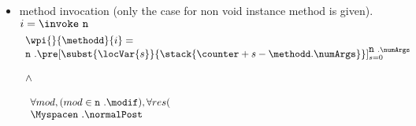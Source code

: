 \begin{itemize}
\begin{enumerate}
	\end{enumerate}
	 		\item method invocation  (only the case for non void instance method is given).
			$i =\invoke  \   \mbox{\rm\texttt{n} } $ 
	 				 			$$\begin{array}{l}
								 \wpi{ } {\methodd}{i}  =   \\
	 				 	 \mbox{\rm\texttt{n} } .\pre[ \subst{\locVar{s}}{ \stack{\counter + s -\methodd.\numArgs}}]_{s = 0}^{ \mbox{\rm\texttt{n} }  .\numArgs }  \\ \\
	 				 			\wedge \\\\
								\begin{array}{l}
	 				 			       \forall  mod ,  ( mod \in \mbox{\rm\texttt{n} } .\modif ), \forall res (  \\ 
	 				 				              \Myspace \mbox{\rm\texttt{n} } .\normalPost %

\end{array}
\end{array}$$
\end{itemize}
